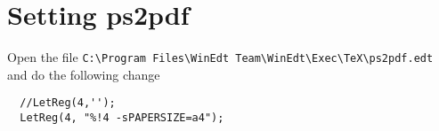 
\chapter{Setting ps2pdf}
\label{sec:ps2pdf}

Open the file \verb"C:\Program Files\WinEdt Team\WinEdt\Exec\TeX\ps2pdf.edt"
and do the following change

\begin{verbatim}
  //LetReg(4,'');
  LetReg(4, "%!4 -sPAPERSIZE=a4");
\end{verbatim}
